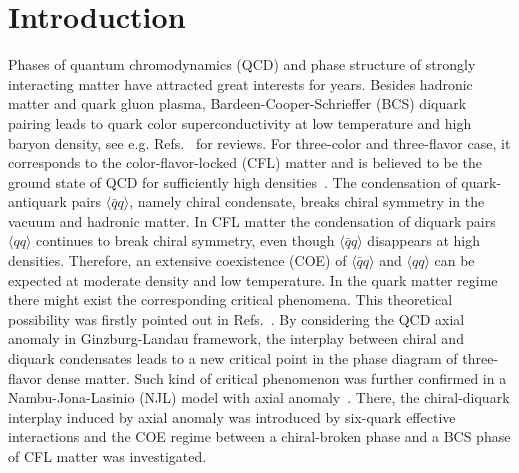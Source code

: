 \documentclass[prd, showpacs,nofootinbib,amsmath,amssymb,12pt]{revtex4}
\begin{document}
\section{Introduction}

Phases of quantum chromodynamics (QCD) and phase structure of strongly interacting matter have attracted great interests for years. Besides hadronic matter and quark gluon plasma, Bardeen-Cooper-Schrieffer (BCS) diquark pairing leads to quark color superconductivity at low temperature and high baryon density, see e.g. Refs.~\cite{alford1999mg,alford2004dense,alford2008color} for reviews.
For three-color and three-flavor case, it corresponds to the color-flavor-locked (CFL)  matter and is believed to be the ground state of QCD for sufficiently high densities~\cite{alford1998qcd}.
The condensation of quark-antiquark pairs $\langle\bar{q}q\rangle$, namely chiral condensate, breaks chiral symmetry in the vacuum and hadronic matter.
In CFL matter the condensation of diquark pairs $\langle qq\rangle$ continues to break chiral symmetry, even though $\langle\bar{q}q\rangle$ disappears at high densities. Therefore, an extensive coexistence (COE) of $\langle\bar{q}q\rangle$ and $\langle qq\rangle$ can be expected at moderate density and low temperature. 
In the quark matter regime there might exist the corresponding critical phenomena. This theoretical possibility was firstly pointed out in Refs.~\cite{yamamoto2007phase,hatsuda2006new}.
By considering the QCD axial anomaly in Ginzburg-Landau framework, the interplay between chiral and diquark condensates leads to a new critical point in the phase diagram of three-flavor dense matter.
Such kind of critical phenomenon was further confirmed in a Nambu-Jona-Lasinio (NJL) model with axial anomaly~\cite{abuki2010nambu,basler2010role,Powell2011Axial}.
There, the chiral-diquark interplay induced by axial anomaly was introduced by six-quark effective interactions and the COE regime between a chiral-broken phase and a BCS phase of CFL matter was investigated. 
\end{document}
